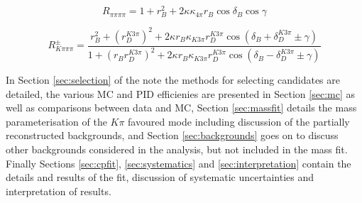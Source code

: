 \begin{equation}
R_{\pi\pi\pi\pi} = 1 + r_B^2 + 2 \kappa\kappa_{4\pi} r_B\cos\delta_B\cos\gamma
\label{exp_R4pi}
\end{equation}

\begin{equation}
R^{\pm}_{K\pi\pi\pi} = \frac{r_B^2 + \left(r_D^{K3\pi}\right)^2 + 2\kappa r_B \kappa_{K3\pi} r_D^{K3\pi} \cos(\delta_B + \delta_D^{K3\pi} \pm \gamma)}{1 + \left(r_Br_D^{K3\pi}\right)^2 + 2\kappa r_B \kappa_{K3\pi} r_D^{K3\pi} \cos(\delta_B - \delta_D^{K3\pi} \pm \gamma)}
\label{exp_Rpm4body}
\end{equation}


In Section \ref{sec:selection} of the note the methods for selecting \decay{\Bpm}{\D\Kstarpm} candidates are detailed, the various MC and PID efficienies are presented in Section \ref{sec:mc} as well as comparisons between data and MC, Section \ref{sec:massfit} details the mass parameterisation of the $K\pi$ favoured mode including discussion of the partially reconstructed backgrounds, and Section \ref{sec:backgrounds} goes on to discuss other backgrounds considered in the analysis, but not included in the mass fit. Finally Sections \ref{sec:cpfit}, \ref{sec:systematics} and \ref{sec:interpretation} contain the details and results of the \CP fit, discussion of systematic uncertainties and interpretation of results.
